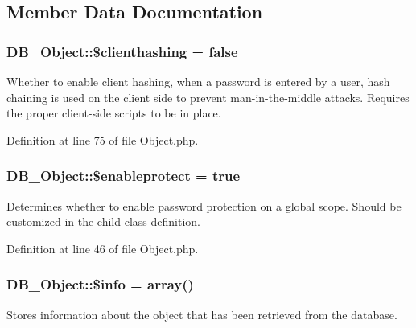 \subsection{Member Data Documentation}
\hypertarget{classDB__Object_a5ba1c6aa344fb0a4f91da7095105ee72}{
\subsubsection[{\$clienthashing}]{\setlength{\rightskip}{0pt plus 5cm}DB\_\-Object::\$clienthashing = false}}
\label{dc/d6d/classDB__Object_a5ba1c6aa344fb0a4f91da7095105ee72}
Whether to enable client hashing, when a password is entered by a user, hash chaining is used on the client side to prevent man-\/in-\/the-\/middle attacks. Requires the proper client-\/side scripts to be in place. 

Definition at line 75 of file Object.php.\hypertarget{classDB__Object_a4b05c22c55cb43234cc80dd35b1d542b}{
\subsubsection[{\$enableprotect}]{\setlength{\rightskip}{0pt plus 5cm}DB\_\-Object::\$enableprotect = true}}
\label{dc/d6d/classDB__Object_a4b05c22c55cb43234cc80dd35b1d542b}
Determines whether to enable password protection on a global scope. Should be customized in the child class definition. 

Definition at line 46 of file Object.php.\hypertarget{classDB__Object_adec88cd7f52f2cbe98d4568c86d1e172}{
\subsubsection[{\$info}]{\setlength{\rightskip}{0pt plus 5cm}DB\_\-Object::\$info = array()}}
\label{dc/d6d/classDB__Object_adec88cd7f52f2cbe98d4568c86d1e172}
Stores information about the object that has been retrieved from the database. 

